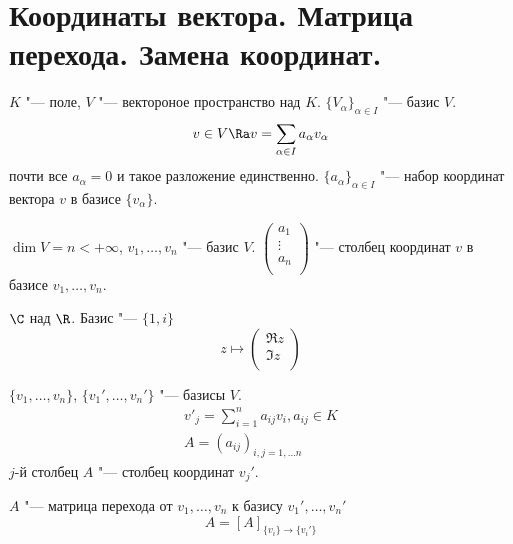 ﻿\section[Коор-ты вектора. Матрица перехода. Замена коор-т]{Координаты вектора. Матрица перехода. Замена координат.}

\begin{Def}
	$K$ "---  поле, $V$ "--- вектороное пространство над $K$.
	$\{V_{\alpha}\}_{\alpha \in I}$ "--- базис $V$.
	\[ v \in V \Ra v = \sum_{\alpha \in I}a_{\alpha}v_{\alpha} \]
	почти все $a_{\alpha} = 0$ и такое разложение единственно.
	$\{a_{\alpha}\}_{\alpha \in I}$ "--- набор координат вектора $v$ в базисе $\{v_{\alpha}\}$.
\end{Def}

\begin{Def}
	$\dim V = n < +\infty$, $v_1, \dots, v_n$ "--- базис $V$.
	$
		\begin{pmatrix}
			a_1\\
			\vdots\\
		a_n\\
		\end{pmatrix}
	$ "--- столбец координат $v$ в базисе $v_1, \dots, v_n$.
\end{Def}

\begin{exmp}
	$\C$ над $\R$. Базис "--- $\{1, i\}$
	\[
		z \mapsto
		\begin{pmatrix}
			\Re z\\
			\Im z\\
		\end{pmatrix}
	\]
\end{exmp}

\begin{Def}
	$\{v_1, \dots, v_n\}$, $\{v_1', \dots, v_n'\}$ "--- базисы $V$.
	\begin{gather*}
		v'_j = \sum_{i = 1}^{n}a_{ij}v_i, a_{ij}\in K \\
		A = (a_{ij})_{i, j = 1, \dots n}
	\end{gather*}
	$j$-й столбец $A$ "--- столбец координат $v_j'$.

	$A$ "--- матрица перехода от $v_1, \dots, v_n$ к базису $v_1', \dots, v_n'$
	\[ A = [A]_{\{v_i\} \to \{v_i'\}} \]
\end{Def}

